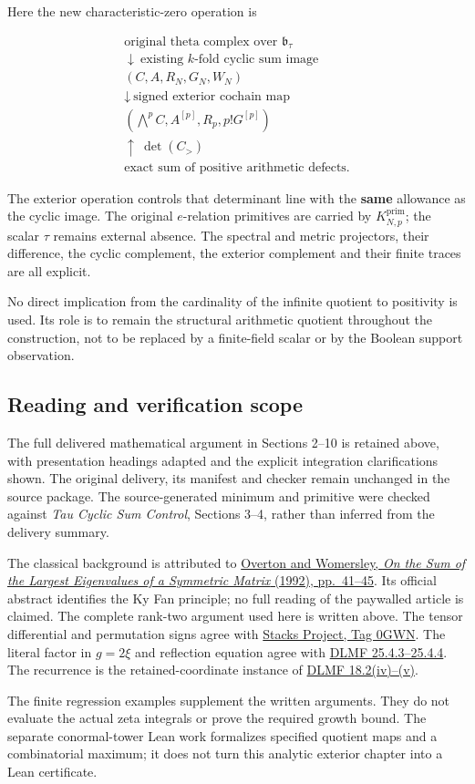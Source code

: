 Here the new characteristic-zero operation is

\[
\begin{gathered}
\text{original theta complex over }\mathfrak b_\tau\\
\downarrow\ \text{existing }k\text{-fold cyclic sum image}\\
(C,A,R_N,G_N,W_N)\\
\downarrow\ \text{signed exterior cochain map}\\
(\bigwedge^p C,A^{[p]},R_p,p!G^{[p]})\\
\uparrow\ \det(C_{>})\\
\text{exact sum of positive arithmetic defects}.
\end{gathered}
\]

The exterior operation controls that determinant line with the
\textbf{same} allowance as the cyclic image. The original \(e\)-relation
primitives are carried by \(K_{N,p}^{\mathrm{prim}}\); the scalar
\(\tau\) remains external absence. The spectral and metric projectors,
their difference, the cyclic complement, the exterior complement and
their finite traces are all explicit.

No direct implication from the cardinality of the infinite quotient to
positivity is used. Its role is to remain the structural arithmetic
quotient throughout the construction, not to be replaced by a
finite-field scalar or by the Boolean support observation.

\subsection[\hspace{0.4em}Reading and verification scope]{Reading and verification scope}
The full delivered mathematical argument in Sections 2--10 is retained
above, with presentation headings adapted and the explicit integration
clarifications shown. The original delivery, its manifest and checker
remain unchanged in the source package.
The source-generated minimum and primitive were checked against
\emph{Tau Cyclic Sum Control}, Sections 3--4, rather than inferred from
the delivery summary.

The classical background is attributed to
\href{https://epubs.siam.org/doi/10.1137/0613006}{Overton and Womersley,
\emph{On the Sum of the Largest Eigenvalues of a Symmetric Matrix}
(1992), pp.\ 41--45}. Its official abstract identifies the Ky Fan
principle; no full reading of the paywalled article is claimed.
The complete rank-two argument used here is written above.
The tensor differential and permutation signs agree with
\href{https://stacks.math.columbia.edu/tag/0GWN}{Stacks Project,
Tag 0GWN}. The literal factor in \(g=2\xi\) and reflection equation agree
with \href{https://dlmf.nist.gov/25.4}{DLMF 25.4.3--25.4.4}.
The recurrence is the retained-coordinate instance of
\href{https://dlmf.nist.gov/18.2}{DLMF 18.2(iv)--(v)}.

The finite regression examples supplement the written arguments.
They do not evaluate the actual zeta integrals or prove the required
growth bound. The separate conormal-tower Lean work formalizes specified
quotient maps and a combinatorial maximum; it does not turn this analytic
exterior chapter into a Lean certificate.
